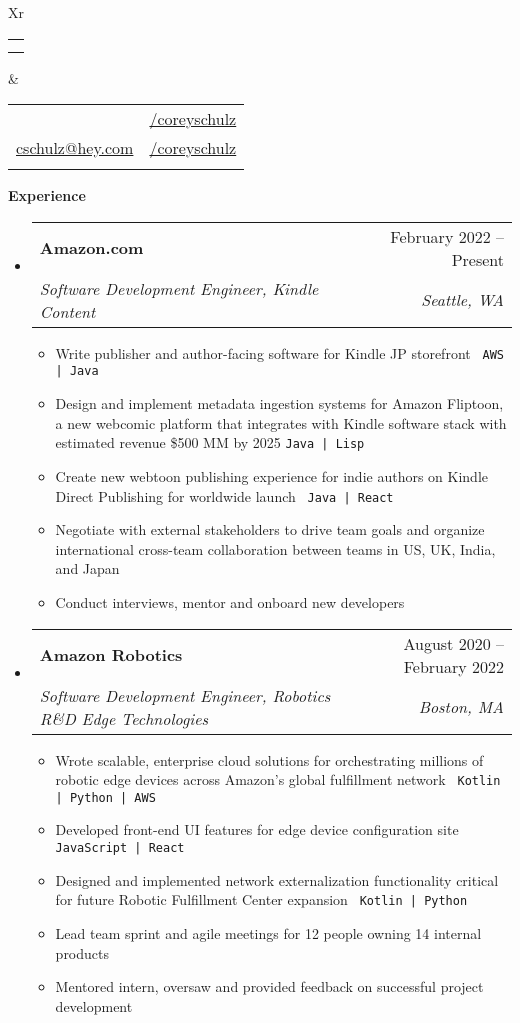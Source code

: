 \documentclass[letterpaper,12pt]{article}[leftmargin=*]
\makeatletter
\def \fullname {Corey Schulz}
\def \linkedinicon {\faLinkedin}
\def \linkedinlink {https://linkedin.com/in/coreyschulz/}
\def \linkedintext {/coreyschulz}
\def \phoneicon {\faPhone}
\def \phonetext {801.898.6226}
\def \emailicon {\faEnvelope}
\def \emaillink {mailto:cschulz@hey.com}
\def \emailtext {cschulz@hey.com}
\def \githubicon {\faGithub}
\def \githublink {https://github.com/coreyschulz}
\def \githubtext {/coreyschulz}
\def \headertype {\doublecol} %
\def \entryspacing {-0pt}
\def \linkedin {\linkedinicon \hspace{3pt}\href{\linkedinlink}{\linkedintext}}
\def \phone {\phoneicon \hspace{3pt}{ \phonetext}}
\def \email {\emailicon \hspace{3pt}\href{\emaillink}{\emailtext}}
\def \github {\githubicon \hspace{3pt}\href{\githublink}{\githubtext}}
\def \website {}
\renewcommand{\section}[2]{\vspace{5pt}
  \colorbox{secondary}{\color{white}\raggedbottom\normalsize\textbf{{#1}{\hspace{7pt}#2}}}
}
\newcommand{\resumeEntryStart}{\begin{itemize}[leftmargin=2.5mm]}
\newcommand{\resumeEntryEnd}{\end{itemize}\vspace{\entryspacing}}
\def\code#1{\texttt{#1}}
\newcommand{\resumeItemListStart}{\begin{itemize}[leftmargin=4.5mm]}
\newcommand{\resumeItemListEnd}{\end{itemize}}
\newcommand{\resumeItem}[1]{
  \item\small{
    {#1 \vspace{-2pt}}
  }
}
\newcommand{\resumeEntryTSDL}[4]{
  \vspace{-1pt}\item[]
    \begin{tabularx}{0.97\textwidth}{X@{\hspace{60pt}}r}
      \textbf{\color{primary}#1} & {\firabook\color{accent}\small#2} \\
      \textit{\color{accent}\small#3} & \textit{\color{accent}\small#4} \\
    \end{tabularx}\vspace{-6pt}
}
\newcommand{\doublecol}[6]{
  \begin{tabularx}{\textwidth}{Xr}
    {
      \begin{tabular}[c]{l}
        \fontsize{35}{45}\selectfont{\color{primary}{{\textbf{\fullname}}}} \\
        {\textit{\subtitle}} %
      \end{tabular}
    } & {
      \begin{tabular}[c]{l@{\hspace{1.5em}}l}
        {\small#4} & {\small#1} \\
        {\small#5} & {\small#2} \\
        {\small#6} & {\small#3}
      \end{tabular}
    }
  \end{tabularx}
}
\newcommand{\singlecol}[6]{
  \begin{tabularx}{\textwidth}{Xr}
    {
      \begin{tabular}[b]{l}
        \fontsize{35}{45}\selectfont{\color{primary}{{\textbf{\fullname}}}} \\
        {\textit{\subtitle}} %
      \end{tabular}
    } & {
      \begin{tabular}[c]{l}
        {\small#1} \\
        {\small#2} \\
        {\small#3} \\
        {\small#4} \\
        {\small#5} \\
        {\small#6}
      \end{tabular}
    }
  \end{tabularx}
}
\makeatother
\begin{document}


\headertype{\linkedin}{\github}{\website}{\phone}{\email}{} %
\vspace{-2pt} %


\section{\faCode}{Experience}


  \resumeEntryStart
    \resumeEntryTSDL
      {\faAmazon \hspace{3pt} Amazon.com}{February 2022 -- Present}
      {Software Development Engineer, Kindle Content}{Seattle, WA}
    \resumeItemListStart
      \resumeItem {Write publisher and author-facing software for Kindle JP storefront \code{ AWS | Java }}
      \resumeItem{ Design and implement metadata ingestion systems for Amazon Fliptoon, a new webcomic platform that integrates with Kindle software stack with estimated revenue \$500 MM by 2025  \code{Java | Lisp}}
      \resumeItem {Create new webtoon publishing experience for indie authors on Kindle Direct Publishing for worldwide launch \code{ Java | React}}
      \resumeItem {Negotiate with external stakeholders to drive team goals and organize international cross-team collaboration between teams in US, UK, India, and Japan}
      \resumeItem {Conduct interviews, mentor and onboard new developers}
      
    \resumeItemListEnd
  \resumeEntryEnd

  \resumeEntryStart
    \resumeEntryTSDL
      {\faAmazon \hspace{3pt} Amazon Robotics}{August 2020 -- February 2022}
      {Software Development Engineer, Robotics R\&D Edge Technologies}{Boston, MA}
    \resumeItemListStart
      \resumeItem {Wrote scalable, enterprise cloud solutions for orchestrating millions of robotic edge devices across Amazon's global fulfillment network \code{ Kotlin | Python | AWS}}
      \resumeItem {Developed front-end UI features for edge device configuration site  \code{ JavaScript | React}}
      \resumeItem {Designed and implemented network externalization functionality critical for future Robotic Fulfillment Center expansion \code{ Kotlin | Python}}
      \resumeItem {Lead team sprint and agile meetings for 12 people owning 14 internal products}
      \resumeItem {Mentored intern, oversaw and provided feedback on successful project development}      
    \resumeItemListEnd
  \resumeEntryEnd
\end{document}
